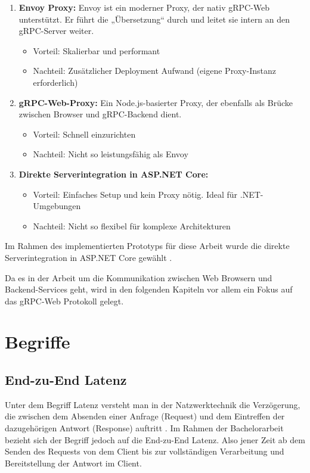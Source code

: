 \begin{enumerate}
	\item \textbf{Envoy Proxy:}
	Envoy ist ein moderner Proxy, der nativ gRPC-Web unterstützt. Er führt die „Übersetzung“ durch und leitet sie intern an den gRPC-Server weiter.	
	\begin{itemize}
		\item Vorteil: Skalierbar und performant
		\item Nachteil: Zusätzlicher Deployment Aufwand (eigene Proxy-Instanz erforderlich)
	\end{itemize}
	
	\item \textbf{gRPC-Web-Proxy:}
	Ein Node.js-basierter Proxy, der ebenfalls als Brücke zwischen Browser und gRPC-Backend dient.
	\begin{itemize}
		\item Vorteil: Schnell einzurichten
		\item Nachteil: Nicht so leistungsfähig als Envoy
	\end{itemize}

	
	\item \textbf{Direkte Serverintegration in ASP.NET Core:}
	\begin{itemize}
		\item Vorteil: Einfaches Setup und kein Proxy nötig. Ideal für .NET-Umgebungen
		\item Nachteil: Nicht so flexibel für komplexe Architekturen
	\end{itemize}
\end{enumerate}

Im Rahmen des implementierten Prototyps für diese Arbeit wurde die direkte Serverintegration in ASP.NET Core gewählt \parencite{grpc-web-docs,aspnet-grpcweb}.

Da es in der Arbeit um die Kommunikation zwischen Web Browsern und Backend-Services geht, wird in den folgenden Kapiteln vor allem ein Fokus auf das gRPC-Web Protokoll gelegt.

\clearpage
\section{Begriffe}
\subsection{End-zu-End Latenz}
Unter dem Begriff Latenz versteht man in der Natzwerktechnik die Verzögerung, die zwischen dem Absenden einer Anfrage (Request) und dem Eintreffen der dazugehörigen Antwort (Response) auftritt \parencite{aws-latency}. Im Rahmen der Bachelorarbeit bezieht sich der Begriff jedoch auf die End-zu-End Latenz. Also jener Zeit ab dem Senden des Requests von dem Client bis zur vollständigen Verarbeitung und Bereitstellung der Antwort im Client. 


